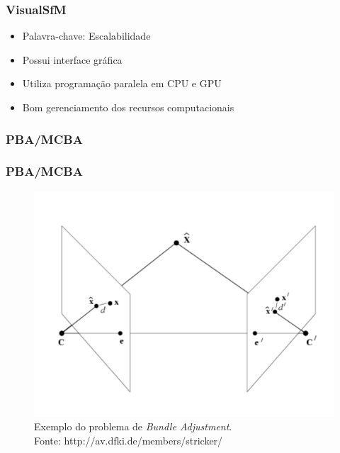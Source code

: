 \documentclass[table, usenames, svgnames, xcolor=dvipsnames]{beamer}
\begin{document}
\begin{frame} 
\frametitle{\textbf{VisualSfM}}
	\begin{center}
		\begin{itemize}
			\item {Palavra-chave: Escalabilidade}
			\item {Possui interface gráfica}
			\item {Utiliza programação paralela em CPU e GPU}
			\item {Bom gerenciamento dos recursos computacionais}
		\end{itemize}
	\end{center}
\end{frame}

\subsubsection{PBA/MCBA}
\begin{frame} 
\frametitle{\textbf{PBA/MCBA}}
	\begin{center}
		\begin{figure}
			\includegraphics[width=0.6\linewidth]{figs/bundleAdjustment.png}
			\caption{Exemplo do problema de \protect\emph{Bundle Adjustment}. \\
			\tiny{Fonte: http://av.dfki.de/members/stricker/}
			}
		\end{figure}
	\end{center}
\end{frame}

\end{document}
